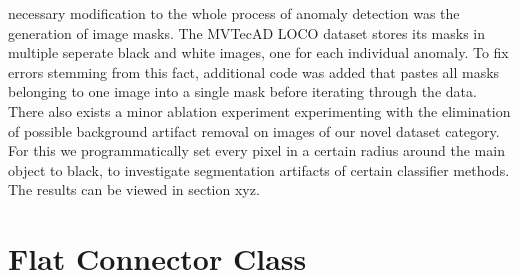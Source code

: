 necessary modification to the whole process of anomaly detection was the generation of image masks. The MVTecAD LOCO dataset stores its 
masks in multiple seperate black and white images, one for each individual anomaly. To fix errors stemming from this fact, additional 
code was added that pastes all masks belonging to one image into a single mask before iterating through the data. 
There also exists a minor ablation experiment experimenting with the elimination 
of possible background artifact removal on images of our novel dataset category. For this we programmatically set every pixel in a certain radius around the main object to black, to investigate 
segmentation artifacts of certain classifier methods. The results can be viewed in section xyz.



\section{Flat Connector Class}
\label{sec:ourflatconnectclass}

